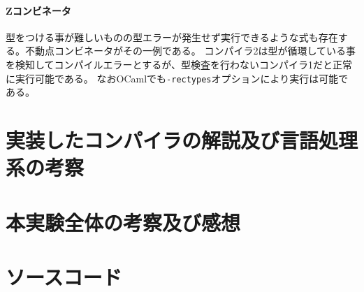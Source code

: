 \documentclass[report]{jlreq}
\begin{document}
      \subsubsection{Zコンビネータ}
        型をつける事が難しいものの型エラーが発生せず実行できるような式も存在する。不動点コンビネータがその一例である。
        コンパイラ2は型が循環している事を検知してコンパイルエラーとするが、型検査を行わないコンパイラ1だと正常に実行可能である。
        なおOCamlでも\texttt{-rectypes}オプションにより実行は可能である。
        

  \chapter{実装したコンパイラの解説及び言語処理系の考察}
  \chapter{本実験全体の考察及び感想}
  \chapter{ソースコード}
    
\end{document}
